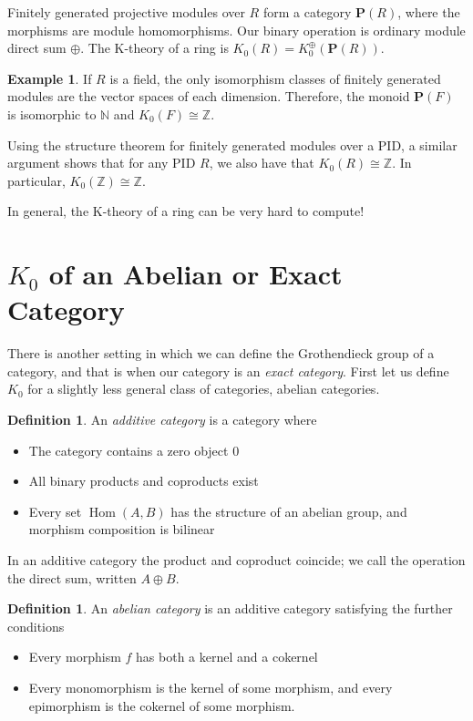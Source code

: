 \documentclass[10pt,a4paper]{article}
\DeclareMathOperator{\Hom}{Hom}
\theoremstyle{definition}
\newtheorem{example}[theorem]{Example}
\newtheorem{definition}[theorem]{Definition}
\begin{document}
Finitely generated projective modules over $R$ form a category $\mathbf{P}(R)$, where the morphisms are module homomorphisms. Our binary operation is ordinary module direct sum $\oplus$. The K-theory of a ring is $K_0(R) = K_0^\oplus(\mathbf{P}(R))$.

\begin{example}
If $R$ is a field, the only isomorphism classes of finitely generated modules are the vector spaces of each dimension. Therefore, the monoid $\mathbf{P}(F)$ is isomorphic to $\mathbb{N}$ and $K_0(F) \cong \mathbb{Z}$.

Using the structure theorem for finitely generated modules over a PID, a similar argument shows that for any PID $R$, we also have that $K_0(R) \cong \mathbb{Z}$. In particular, $K_0(\mathbb{Z}) \cong \mathbb{Z}$.
\end{example}

In general, the K-theory of a ring can be very hard to compute!

\section{$K_0$ of an Abelian or Exact Category}

There is another setting in which we can define the Grothendieck group of a category, and that is when our category is an \emph{exact category}. First let us define $K_0$ for a slightly less general class of categories, abelian categories.

\begin{definition}
An \emph{additive category} is a category where
\begin{itemize}
\itemsep0em
\item The category contains a zero object $0$
\item All binary products and coproducts exist
\item Every set $\Hom(A, B)$ has the structure of an abelian group, and morphism composition is bilinear
\end{itemize}
\end{definition}

In an additive category the product and coproduct coincide; we call the operation the direct sum, written $A \oplus B$.

\begin{definition}
An \emph{abelian category} is an additive category satisfying the further conditions
\begin{itemize}
\itemsep0em
\item Every morphism $f$ has both a kernel and a cokernel
\item Every monomorphism is the kernel of some morphism, and every epimorphism is the cokernel of some morphism.
\end{itemize}
\end{definition}
\end{document}

